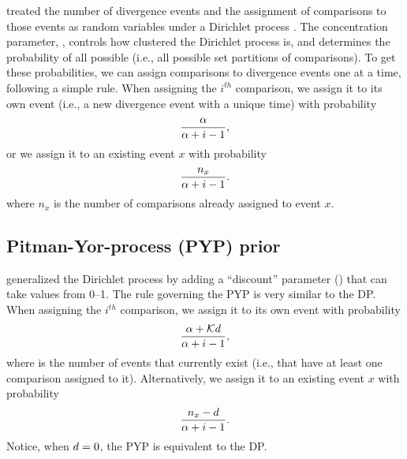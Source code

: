 \begin{linenomath}
\citet{Oaks2018ecoevolity} treated the number of divergence events and the
assignment of comparisons to those events as random variables under a Dirichlet
process \citep{Ferguson1973, Antoniak1974}.
The concentration parameter, \concentration, controls how clustered the
Dirichlet process is, and determines the probability of all possible \etimesets
(i.e., all possible set partitions of \ncomparisons comparisons).
To get these probabilities, we can assign comparisons to divergence events one
at a time, following a simple rule.
When assigning the $i^{th}$ comparison, we assign it to its own event
(i.e., a new divergence event with a unique time) with probability
\begin{equation}
    \frac{\alpha}{\alpha + i - 1},
    \label{eq:dpnewcat}
\end{equation}
or we assign it to an existing event $x$ with probability
\begin{equation}
    \frac{n_x}{\alpha + i - 1}.
    \label{eq:dpexistingcat}
\end{equation}
where $n_x$ is the number of comparisons already assigned to event $x$.
\end{linenomath}

\subsection{Pitman-Yor-process (PYP) prior}

\begin{linenomath}
\citet{PitmanYor1997} generalized the Dirichlet process by adding a
``discount'' parameter (\discount) that can take values from 0--1.
The rule governing the PYP is very similar to the DP.
When assigning the $i^{th}$ comparison, we assign it to its own event
with probability
\begin{equation}
    \frac{\alpha + \mathcal{K} d}{\alpha + i - 1},
    \label{eq:pypnewcat}
\end{equation}
where \nexistingcats is the number of events that currently exist (i.e., that have at
least one comparison assigned to it).
Alternatively, we assign it to an existing event $x$ with probability
\begin{equation}
    \frac{n_x - d}{\alpha + i -1}.
    \label{eq:pypexistingcat}
\end{equation}
Notice, when $d = 0$, the PYP is equivalent to the DP.
\end{linenomath}

